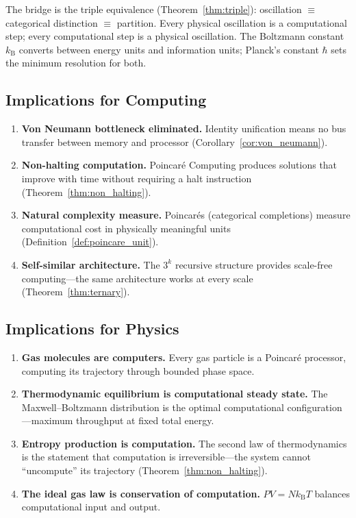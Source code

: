 \documentclass[twocolumn,10pt,a4paper]{article}
\theoremstyle{plain}
\theoremstyle{definition}
\theoremstyle{remark}
\newcommand{\kB}{k_{\mathrm{B}}}
\begin{document}
The bridge is the triple equivalence (Theorem~\ref{thm:triple}): oscillation $\equiv$ categorical distinction $\equiv$ partition. Every physical oscillation is a computational step; every computational step is a physical oscillation. The Boltzmann constant $\kB$ converts between energy units and information units; Planck's constant $\hbar$ sets the minimum resolution for both.

\subsection{Implications for Computing}

\begin{enumerate}
    \item \textbf{Von Neumann bottleneck eliminated.} Identity unification means no bus transfer between memory and processor (Corollary~\ref{cor:von_neumann}).
    \item \textbf{Non-halting computation.} Poincar\'{e} Computing produces solutions that improve with time without requiring a halt instruction (Theorem~\ref{thm:non_halting}).
    \item \textbf{Natural complexity measure.} Poincar\'{e}s (categorical completions) measure computational cost in physically meaningful units (Definition~\ref{def:poincare_unit}).
    \item \textbf{Self-similar architecture.} The $3^k$ recursive structure provides scale-free computing---the same architecture works at every scale (Theorem~\ref{thm:ternary}).
\end{enumerate}

\subsection{Implications for Physics}

\begin{enumerate}
    \item \textbf{Gas molecules are computers.} Every gas particle is a Poincar\'{e} processor, computing its trajectory through bounded phase space.
    \item \textbf{Thermodynamic equilibrium is computational steady state.} The Maxwell--Boltzmann distribution is the optimal computational configuration---maximum throughput at fixed total energy.
    \item \textbf{Entropy production is computation.} The second law of thermodynamics is the statement that computation is irreversible---the system cannot ``uncompute'' its trajectory (Theorem~\ref{thm:non_halting}).
    \item \textbf{The ideal gas law is conservation of computation.} $PV = N\kB T$ balances computational input and output.
\end{enumerate}
\end{document}
